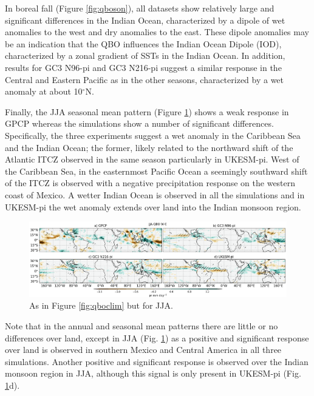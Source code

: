 In boreal fall (Figure \ref{fig:qboson}), all datasets show relatively large and significant differences in the Indian Ocean, characterized by a dipole of wet anomalies to the west and dry anomalies to the east. These dipole anomalies may be an indication that the QBO influences the Indian Ocean Dipole (IOD), characterized by a zonal gradient of SSTs in the Indian Ocean. In addition, results for GC3 N96-pi and GC3 N216-pi suggest a similar response in the Central and Eastern Pacific as in the other seasons, characterized by a wet anomaly at about 10$^\circ$N.

Finally, the JJA seasonal mean pattern (Figure \ref{fig:qbojja}) shows a weak response in GPCP whereas the simulations show a number of significant differences. Specifically, the three experiments suggest a wet anomaly in the Caribbean Sea and the Indian Ocean; the former, likely related to the northward shift of the Atlantic ITCZ observed in the same season particularly in UKESM-pi. West of the Caribbean Sea, in the easternmost Pacific Ocean a seemingly southward shift of the ITCZ is observed with a negative precipitation response on the western coast of Mexico.
A wetter Indian Ocean is observed in all the simulations and in UKESM-pi the wet anomaly extends over land into the Indian monsoon region.

\begin{figure}[t!]
\centering
 \includegraphics[width=\linewidth]{figures/piprjjaqbowqboe.png}
\caption[JJA mean precipitation composite difference QBO W-E ]{ As in Figure \ref{fig:qboclim} but for JJA. }
\label{fig:qbojja}
\end{figure}


 Note that in the annual and seasonal mean patterns there are little or no differences over land, except in JJA (Fig. \ref{fig:qbojja}) as a positive and significant response over land is observed in southern Mexico and Central America in all three simulations. Another positive and significant response is observed over the Indian monsoon region in JJA, although this signal is only present in UKESM-pi (Fig. \ref{fig:qbojja}d). 

